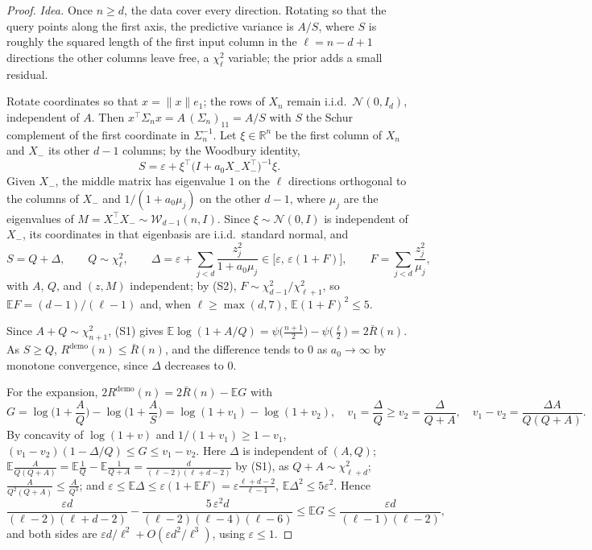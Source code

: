 \documentclass{article}
\newcommand{\E}{\mathbb{E}}
\newcommand{\R}{\mathbb{R}}
\begin{document}
\begin{proof}
\emph{Idea.} Once $n \ge d$, the data cover every direction. Rotating so that the query points along the first axis, the predictive variance is $A/S$, where $S$ is roughly the squared length of the first input column in the $\ell = n - d + 1$ directions the other columns leave free, a $\chi^2_\ell$ variable; the prior adds a small residual.

Rotate coordinates so that $x = \|x\| e_1$; the rows of $X_n$ remain i.i.d.\ $\mathcal{N}(0, I_d)$, independent of $A$. Then $x^\top \Sigma_n x = A\,(\Sigma_n)_{11} = A/S$ with $S$ the Schur complement of the first coordinate in $\Sigma_n^{-1}$. Let $\xi \in \R^n$ be the first column of $X_n$ and $X_-$ its other $d-1$ columns; by the Woodbury identity,
\[
S = \varepsilon + \xi^\top \big(I + a_0 X_- X_-^\top\big)^{-1} \xi .
\]
Given $X_-$, the middle matrix has eigenvalue $1$ on the $\ell$ directions orthogonal to the columns of $X_-$ and $1/(1 + a_0 \mu_j)$ on the other $d - 1$, where $\mu_j$ are the eigenvalues of $M = X_-^\top X_- \sim \mathcal{W}_{d-1}(n, I)$. Since $\xi \sim \mathcal{N}(0, I)$ is independent of $X_-$, its coordinates in that eigenbasis are i.i.d.\ standard normal, and
\[
S = Q + \Delta, \qquad Q \sim \chi^2_\ell, \qquad
\Delta = \varepsilon + \sum_{j < d} \frac{z_j^2}{1 + a_0 \mu_j} \in \big[\varepsilon,\, \varepsilon(1 + F)\big], \qquad F = \sum_{j < d} \frac{z_j^2}{\mu_j},
\]
with $A$, $Q$, and $(z, M)$ independent; by (S2), $F \sim \chi^2_{d-1} / \chi^2_{\ell+1}$, so $\E F = (d-1)/(\ell-1)$ and, when $\ell \ge \max(d, 7)$, $\E (1+F)^2 \le 5$.

Since $A + Q \sim \chi^2_{n+1}$, (S1) gives $\E \log(1 + A/Q) = \psi\big(\tfrac{n+1}{2}\big) - \psi\big(\tfrac{\ell}{2}\big) = 2\bar R(n)$. As $S \ge Q$, $R^{\mathrm{demo}}(n) \le \bar R(n)$, and the difference tends to $0$ as $a_0 \to \infty$ by monotone convergence, since $\Delta$ decreases to $0$.

For the expansion, $2R^{\mathrm{demo}}(n) = 2\bar R(n) - \E G$ with
\[
G = \log\Big(1 + \frac{A}{Q}\Big) - \log\Big(1 + \frac{A}{S}\Big) = \log(1 + v_1) - \log(1 + v_2), \quad v_1 = \frac{\Delta}{Q} \ge v_2 = \frac{\Delta}{Q + A}, \quad v_1 - v_2 = \frac{\Delta A}{Q(Q+A)} .
\]
By concavity of $\log(1+v)$ and $1/(1+v_1) \ge 1 - v_1$, $(v_1 - v_2)(1 - \Delta/Q) \le G \le v_1 - v_2$. Here $\Delta$ is independent of $(A, Q)$; $\E \frac{A}{Q(Q+A)} = \E\frac1Q - \E\frac{1}{Q+A} = \frac{d}{(\ell-2)(\ell+d-2)}$ by (S1), as $Q + A \sim \chi^2_{\ell+d}$; $\frac{A}{Q^2(Q+A)} \le \frac{A}{Q^3}$; and $\varepsilon \le \E\Delta \le \varepsilon(1 + \E F) = \varepsilon\frac{\ell+d-2}{\ell-1}$, $\E \Delta^2 \le 5\varepsilon^2$. Hence
\[
\frac{\varepsilon d}{(\ell-2)(\ell+d-2)} - \frac{5\,\varepsilon^2 d}{(\ell-2)(\ell-4)(\ell-6)} \le \E G \le \frac{\varepsilon d}{(\ell-1)(\ell-2)} ,
\]
and both sides are $\varepsilon d / \ell^2 + O(\varepsilon d^2 / \ell^3)$, using $\varepsilon \le 1$.
\end{proof}
\end{document}
